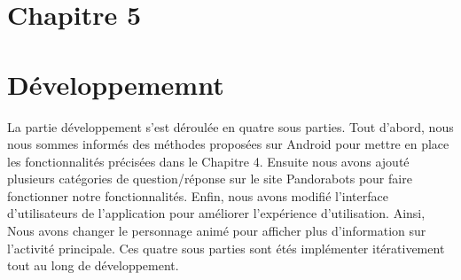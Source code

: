 \section*{Chapitre 5}
\section{Développememnt}
	La partie développement s'est déroulée en quatre sous parties. Tout d'abord, nous nous sommes informés des méthodes proposées sur Android pour mettre en place les fonctionnalités précisées dans le Chapitre 4. Ensuite nous avons ajouté plusieurs catégories de question/réponse sur le site Pandorabots pour faire fonctionner notre fonctionnalités. Enfin, nous avons modifié l'interface d'utilisateurs de l'application pour améliorer l'expérience d'utilisation. Ainsi, Nous avons changer le personnage animé pour afficher plus d'information sur l'activité principale. Ces quatre sous parties sont étés implémenter itérativement tout au long de développement.
